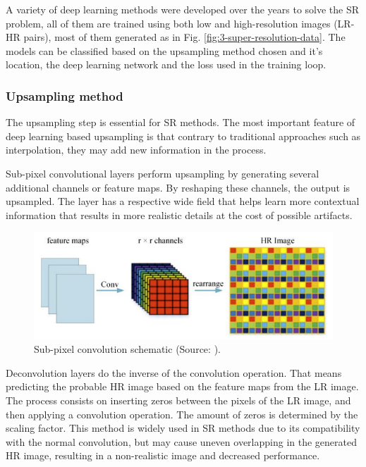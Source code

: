         A variety of deep learning methods were developed over the years to solve the SR problem, all of them are trained using both low and high-resolution images (LR-HR pairs), most of them generated as in Fig. \ref{fig:3-super-resolution-data}. The models can be classified based on the upsampling method chosen and it's location, the deep learning network and the loss used in the training loop.


        \subsubsection{Upsampling method}

        The upsampling step is essential for SR methods. The most important feature of deep learning based upsampling  is that contrary to traditional approaches such as interpolation, they may add new information in the process.

        Sub-pixel convolutional layers perform upsampling by generating several additional channels or feature maps. By reshaping these channels, the output is upsampled. The layer has a respective wide field that helps learn more contextual information that results in more realistic details at the cost of possible artifacts.
        
        \begin{figure}[H]
            \centering
            \includegraphics[width=\textwidth]{Includes/2-sub-pixel-convolution.png}
            \caption{Sub-pixel convolution schematic (Source: \cite{Liu2019}).}
            \label{fig:2-sub-pixel-convolution}
        \end{figure}


        

        Deconvolution layers do the inverse of the convolution operation. 
        That means predicting the probable HR image based on the feature maps from the LR image. The process consists on inserting zeros between the pixels of the LR image, and then applying a convolution operation. The amount of zeros is determined by the scaling factor. This method is widely used in SR methods due to its compatibility with the normal convolution, but may cause uneven overlapping in the generated HR image, resulting in a non-realistic image and decreased performance.

